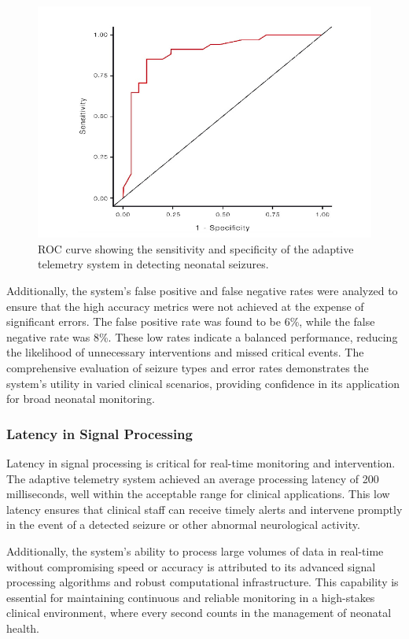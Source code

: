 \documentclass[12pt,journal,compsoc]{IEEEtran}
\begin{document}
\begin{figure}[H]
    \centering
    \includegraphics[width=0.8\linewidth]{sensitivity_vs_specitivity.png}
    \caption{ROC curve showing the sensitivity and specificity of the adaptive telemetry system in detecting neonatal seizures.}
    \label{fig:roc_curve}
\end{figure}

Additionally, the system's false positive and false negative rates were analyzed to ensure that the high accuracy metrics were not achieved at the expense of significant errors. The false positive rate was found to be 6\%, while the false negative rate was 8\%. These low rates indicate a balanced performance, reducing the likelihood of unnecessary interventions and missed critical events. The comprehensive evaluation of seizure types and error rates demonstrates the system's utility in varied clinical scenarios, providing confidence in its application for broad neonatal monitoring.

\subsubsection{Latency in Signal Processing}

Latency in signal processing is critical for real-time monitoring and intervention. The adaptive telemetry system achieved an average processing latency of 200 milliseconds, well within the acceptable range for clinical applications. This low latency ensures that clinical staff can receive timely alerts and intervene promptly in the event of a detected seizure or other abnormal neurological activity.

Additionally, the system's ability to process large volumes of data in real-time without compromising speed or accuracy is attributed to its advanced signal processing algorithms and robust computational infrastructure. This capability is essential for maintaining continuous and reliable monitoring in a high-stakes clinical environment, where every second counts in the management of neonatal health.
\end{document}
